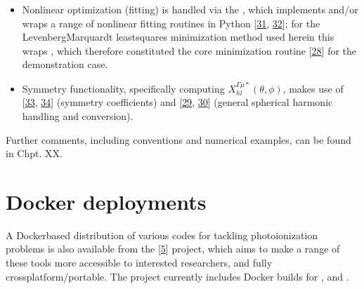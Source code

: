 \documentclass[letterpaper,table,10pt,english]{jupyterBook}
\begin{document}
\begin{itemize}
\item {} 
\sphinxAtStartPar
Non\sphinxhyphen{}linear optimization (fitting) is handled via the , which implements and/or wraps a range of non\sphinxhyphen{}linear fitting routines in Python {[}\hyperlink{cite.backmatter/bibliography:id635}{31}, \hyperlink{cite.backmatter/bibliography:id672}{32}{]}; for the Levenberg\sphinxhyphen{}Marquardt least\sphinxhyphen{}squares minimization method used herein this wraps
, which therefore constituted the core minimization routine {[}\hyperlink{cite.backmatter/bibliography:id730}{28}{]} for the demonstration case.

\item {} 
\sphinxAtStartPar
Symmetry functionality, specifically computing \(X_{hl}^{\Gamma\mu*}(\theta,\phi)\), makes use of  {[}\hyperlink{cite.backmatter/bibliography:id593}{33}, \hyperlink{cite.backmatter/bibliography:id594}{34}{]} (symmetry coefficients) and  {[}\hyperlink{cite.backmatter/bibliography:id800}{29}, \hyperlink{cite.backmatter/bibliography:id740}{30}{]} (general spherical harmonic handling and conversion).

\end{itemize}

\sphinxAtStartPar
Further comments, including conventions and numerical examples, can be found in Chpt. XX.


\section{Docker deployments}
\label{\detokenize{part1/platform_intro_071122:docker-deployments}}\label{\detokenize{part1/platform_intro_071122:sect-platform-docker}}
\sphinxAtStartPar
A Docker\sphinxhyphen{}based distribution of various codes for tackling
photoionization problems is also available from the  {[}\hyperlink{cite.backmatter/bibliography:id577}{5}{]}
project, which aims to make a range of these tools more accessible to
interested researchers, and fully cross\sphinxhyphen{}platform/portable. The project currently includes Docker builds for ,  and .
\end{document}
